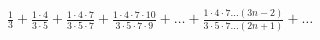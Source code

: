 \item $\displaystyle \frac{1}{3} + \frac{1 \cdot 4}{3 \cdot 5} + \frac{1 \cdot 4 \cdot 7}{3 \cdot 5 \cdot 7} + \frac{1 \cdot 4 \cdot 7 \cdot 10}{3 \cdot 5 \cdot 7 \cdot 9} + \dots + \frac{1 \cdot 4 \cdot 7 \dots (3n-2)}{3 \cdot 5 \cdot 7 \dots (2n+1)} + \dots$
